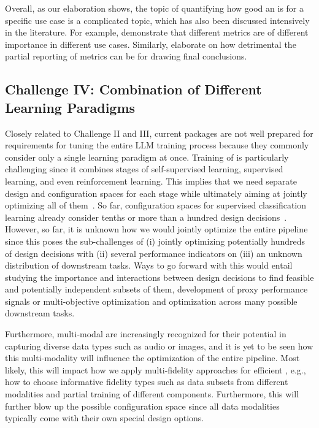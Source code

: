 Overall, as our elaboration shows, the topic of quantifying how good an \LLM is for a specific use case is a complicated topic, which has also been discussed intensively in the literature. For example, \citet{liang-tmlr23a} demonstrate that different metrics are of different importance in different \LLM use cases. Similarly, \citet{dehghani-iclr22a} elaborate on how detrimental the partial reporting of metrics can be for drawing final conclusions.

\subsection{Challenge IV: Combination of Different Learning Paradigms}


Closely related to Challenge II and III, current \AutoML packages are not well prepared for requirements for tuning the entire LLM training process because they commonly consider only a single learning paradigm at once. Training of \LLMs is particularly challenging since it combines stages of self-supervised learning, supervised learning, and even reinforcement learning.
This implies that we need separate design and configuration spaces for each stage while ultimately aiming at jointly optimizing all of them~\cite{hutter-blog22a}. So far, configuration spaces for supervised classification learning already consider tenths or more than a hundred design decisions~\cite{feurer-aaai15a,zimmer-tpami21a,feurer-jmlr22a}. 
However, so far, it is unknown how we would jointly optimize the entire pipeline since this poses the sub-challenges of (i) jointly optimizing potentially hundreds of design decisions with (ii) several performance indicators on (iii) an unknown distribution of downstream tasks. Ways to go forward with this would entail studying the importance and interactions between design decisions to find feasible and potentially independent subsets of them, development of proxy performance signals or multi-objective optimization and optimization across many possible downstream tasks.

Furthermore, multi-modal \LLMs are increasingly recognized for their potential in capturing diverse data types such as audio or images, and it is yet to be seen how this multi-modality will influence the optimization of the entire pipeline. Most likely, this will impact how we apply multi-fidelity approaches for efficient \AutoML, e.g., how to choose informative fidelity types such as data subsets from different modalities and partial training of different components. Furthermore, this will further blow up the possible configuration space since all data modalities typically come with their own special design options.


